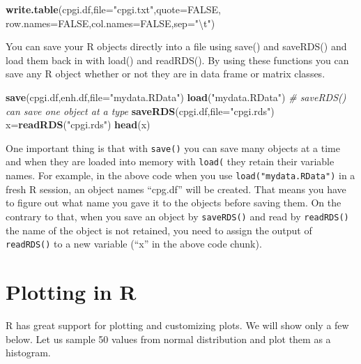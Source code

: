 \documentclass[12pt,]{krantz}
\newenvironment{Shaded}{\begin{snugshade}}{\end{snugshade}}
\newcommand{\CharTok}[1]{\textcolor[rgb]{0.31,0.60,0.02}{#1}}
\newcommand{\CommentTok}[1]{\textcolor[rgb]{0.56,0.35,0.01}{\textit{#1}}}
\newcommand{\DataTypeTok}[1]{\textcolor[rgb]{0.13,0.29,0.53}{#1}}
\newcommand{\KeywordTok}[1]{\textcolor[rgb]{0.13,0.29,0.53}{\textbf{#1}}}
\newcommand{\NormalTok}[1]{#1}
\newcommand{\OtherTok}[1]{\textcolor[rgb]{0.56,0.35,0.01}{#1}}
\newcommand{\StringTok}[1]{\textcolor[rgb]{0.31,0.60,0.02}{#1}}
\begin{document}
\begin{Shaded}
\begin{Highlighting}[]
\KeywordTok{write.table}\NormalTok{(cpgi.df,}\DataTypeTok{file=}\StringTok{"cpgi.txt"}\NormalTok{,}\DataTypeTok{quote=}\OtherTok{FALSE}\NormalTok{,}
            \DataTypeTok{row.names=}\OtherTok{FALSE}\NormalTok{,}\DataTypeTok{col.names=}\OtherTok{FALSE}\NormalTok{,}\DataTypeTok{sep=}\StringTok{"}\CharTok{\textbackslash{}t}\StringTok{"}\NormalTok{)}
\end{Highlighting}
\end{Shaded}

You can save your R objects directly into a file using save() and saveRDS() and load them back in with load() and readRDS(). By using these functions you can save any R object whether or not they are in data frame or matrix classes.

\begin{Shaded}
\begin{Highlighting}[]
\KeywordTok{save}\NormalTok{(cpgi.df,enh.df,}\DataTypeTok{file=}\StringTok{"mydata.RData"}\NormalTok{)}
\KeywordTok{load}\NormalTok{(}\StringTok{"mydata.RData"}\NormalTok{)}
\CommentTok{# saveRDS() can save one object at a type}
\KeywordTok{saveRDS}\NormalTok{(cpgi.df,}\DataTypeTok{file=}\StringTok{"cpgi.rds"}\NormalTok{)}
\NormalTok{x=}\KeywordTok{readRDS}\NormalTok{(}\StringTok{"cpgi.rds"}\NormalTok{)}
\KeywordTok{head}\NormalTok{(x)}
\end{Highlighting}
\end{Shaded}

One important thing is that with \texttt{save()} you can save many objects at a time and when they are loaded into memory with \texttt{load(} they retain their variable names. For example, in the above code when you use \texttt{load("mydata.RData")} in a fresh R session, an object names ``cpg.df'' will be created. That means you have to figure out what name you gave it to the objects before saving them. On the contrary to that, when you save an object by \texttt{saveRDS()} and read by \texttt{readRDS()} the name of the object is not retained, you need to assign the output of \texttt{readRDS()} to a new variable (``x'' in the above code chunk).

\hypertarget{plotting-in-r}{%
\section{Plotting in R}\label{plotting-in-r}}

R has great support for plotting and customizing plots. We will show only a few below. Let us sample 50 values from normal distribution and plot them as a histogram.
\end{document}
